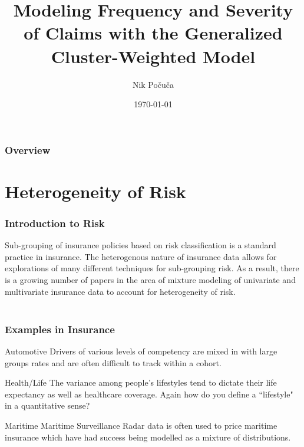 \documentclass{beamer}
\title[GCWM]{Modeling Frequency and Severity of Claims with the Generalized Cluster-Weighted Model } %
\author{Nik Po\v cu\v ca} %
\institute[McMaster University] %
{
McMaster University \\ %
\medskip
\textit{Tatjana Miljkovic, Petar Jevti\' c, and Paul McNicholas} %
}
\date{\today} %
\begin{document}
\begin{frame}
\titlepage %
\end{frame}

\begin{frame}
\frametitle{Overview} %
\tableofcontents %
\end{frame}


\section{Heterogeneity of Risk} %

\begin{frame}
\frametitle{Introduction to Risk}
Sub-grouping of insurance policies based on risk classification is a standard practice in insurance. The heterogenous nature of insurance data allows for explorations of many different techniques for sub-grouping risk. As a result, there is a growing number of papers in the area of mixture modeling of univariate and multivariate insurance data to account for heterogeneity of risk. 
\\~\\
\end{frame}
\begin{frame}
\frametitle{Examples in Insurance}
\begin{block}{Automotive}
Drivers of various levels of competency are mixed in with large groups rates and are often difficult to track within a cohort. 
\end{block}
\begin{block}{Health/Life}
The variance among people's lifestyles tend to dictate their life expectancy as well as healthcare coverage. Again how do you define a ``lifestyle" in a quantitative sense?
\end{block}
\begin{block}{Maritime}
Maritime Surveillance Radar data is often used to price maritime insurance which have had  success being modelled as a mixture of distributions. 
\end{block}
\end{frame}
\end{document}
